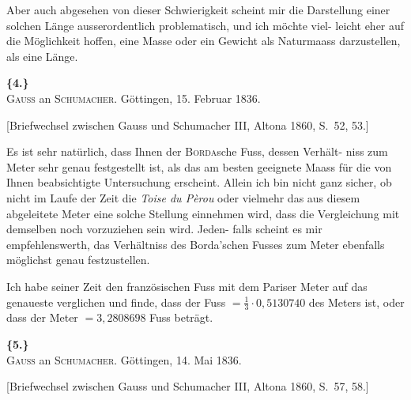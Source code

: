 \documentclass[12pt,a4paper]{article}
\theoremstyle{plain}
\theoremstyle{definition}
\theoremstyle{remark}
\begin{document}
Aber auch abgesehen von dieser Schwierigkeit scheint mir die Darstellung
einer solchen L\"ange ausserordentlich problematisch, und ich m\"ochte viel-
leicht eher auf die M\"oglichkeit hoffen, eine Masse oder ein Gewicht als
Naturmaass darzustellen, als eine L\"ange.

\vspace{0.5cm}

\noindent\textbf{\{4.\}}\\
\textsc{Gauss} an \textsc{Schumacher}. G\"ottingen, 15. Februar 1836.

\vspace{0.2cm}
{\small[Briefwechsel zwischen Gauss und Schumacher III, Altona 1860, S.~52, 53.]}

\vspace{0.3cm}

Es ist sehr nat\"urlich, dass Ihnen der \textsc{Borda}sche Fuss, dessen Verh\"alt-
niss zum Meter sehr genau festgestellt ist, als das am besten geeignete
Maass f\"ur die von Ihnen beabsichtigte Untersuchung erscheint. Allein ich
bin nicht ganz sicher, ob nicht im Laufe der Zeit die \textit{Toise du P\`erou} oder
vielmehr das aus diesem abgeleitete Meter eine solche Stellung einnehmen
wird, dass die Vergleichung mit demselben noch vorzuziehen sein wird. Jeden-
falls scheint es mir empfehlenswerth, das Verh\"altniss des Borda'schen Fusses
zum Meter ebenfalls m\"oglichst genau festzustellen.

Ich habe seiner Zeit den franz\"osischen Fuss mit dem Pariser Meter auf
das genaueste verglichen und finde, dass der Fuss $=\frac{1}{3}\cdot 0{,}5130740$ des
Meters ist, oder dass der Meter $=3{,}2808698$ Fuss betr\"agt.

\vspace{0.5cm}

\noindent\textbf{\{5.\}}\\
\textsc{Gauss} an \textsc{Schumacher}. G\"ottingen, 14. Mai 1836.

\vspace{0.2cm}
{\small[Briefwechsel zwischen Gauss und Schumacher III, Altona 1860, S.~57, 58.]}

\vspace{0.3cm}
\end{document}
